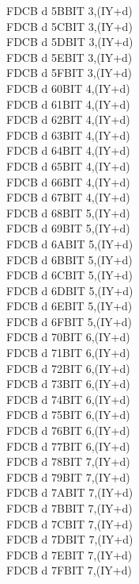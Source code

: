\documentclass[12pt,twoside,openright,a4paper]{book}
\begin{document}
\begin{multicols}{3}
{\begin{tabbing}
	FDCB d 5B\>BIT 3,(IY+d)\UNDOC\\
	FDCB d 5C\>BIT 3,(IY+d)\UNDOC\\
	FDCB d 5D\>BIT 3,(IY+d)\UNDOC\\
	FDCB d 5E\>BIT 3,(IY+d)\\
	FDCB d 5F\>BIT 3,(IY+d)\UNDOC\\
	FDCB d 60\>BIT 4,(IY+d)\UNDOC\\
	FDCB d 61\>BIT 4,(IY+d)\UNDOC\\
	FDCB d 62\>BIT 4,(IY+d)\UNDOC\\
	FDCB d 63\>BIT 4,(IY+d)\UNDOC\\
	FDCB d 64\>BIT 4,(IY+d)\UNDOC\\
	FDCB d 65\>BIT 4,(IY+d)\UNDOC\\
	FDCB d 66\>BIT 4,(IY+d)\\
	FDCB d 67\>BIT 4,(IY+d)\UNDOC\\
	FDCB d 68\>BIT 5,(IY+d)\UNDOC\\
	FDCB d 69\>BIT 5,(IY+d)\UNDOC\\
	FDCB d 6A\>BIT 5,(IY+d)\UNDOC\\
	FDCB d 6B\>BIT 5,(IY+d)\UNDOC\\
	FDCB d 6C\>BIT 5,(IY+d)\UNDOC\\
	FDCB d 6D\>BIT 5,(IY+d)\UNDOC\\
	FDCB d 6E\>BIT 5,(IY+d)\\
	FDCB d 6F\>BIT 5,(IY+d)\UNDOC\\
	FDCB d 70\>BIT 6,(IY+d)\UNDOC\\
	FDCB d 71\>BIT 6,(IY+d)\UNDOC\\
	FDCB d 72\>BIT 6,(IY+d)\UNDOC\\
	FDCB d 73\>BIT 6,(IY+d)\UNDOC\\
	FDCB d 74\>BIT 6,(IY+d)\UNDOC\\
	FDCB d 75\>BIT 6,(IY+d)\UNDOC\\
	FDCB d 76\>BIT 6,(IY+d)\\
	FDCB d 77\>BIT 6,(IY+d)\UNDOC\\
	FDCB d 78\>BIT 7,(IY+d)\UNDOC\\
	FDCB d 79\>BIT 7,(IY+d)\UNDOC\\
	FDCB d 7A\>BIT 7,(IY+d)\UNDOC\\
	FDCB d 7B\>BIT 7,(IY+d)\UNDOC\\
	FDCB d 7C\>BIT 7,(IY+d)\UNDOC\\
	FDCB d 7D\>BIT 7,(IY+d)\UNDOC\\
	FDCB d 7E\>BIT 7,(IY+d)\\
	FDCB d 7F\>BIT 7,(IY+d)\UNDOC\\

\end{tabbing}}
\end{multicols}
\end{document}
